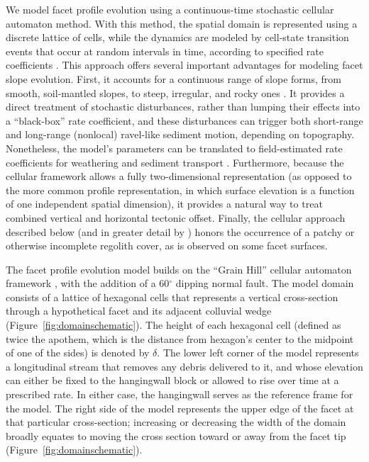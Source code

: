 We model facet profile evolution using a continuous-time stochastic cellular automaton method. With this method, the spatial domain is represented using a discrete lattice of cells, while the dynamics are modeled by cell-state transition events that occur at random intervals in time, according to specified rate coefficients \citep{narteau2001small,narteau2009setting}. This approach offers several important advantages for modeling facet slope evolution. First, it accounts for a continuous range of slope forms, from smooth, soil-mantled slopes, to steep, irregular, and rocky ones \citep{tucker2018lattice}. It provides a direct treatment of stochastic disturbances, rather than lumping their effects into a ``black-box'' rate coefficient, and these disturbances can trigger both short-range and long-range (nonlocal) ravel-like sediment motion, depending on topography. Nonetheless, the model's parameters can be translated to field-estimated rate coefficients for weathering and sediment transport \citep{tucker2018lattice}. Furthermore, because the cellular framework allows a fully two-dimensional representation (as opposed to the more common profile representation, in which surface elevation is a function of one independent spatial dimension), it provides a natural way to treat combined vertical and horizontal tectonic offset. Finally, the cellular approach described below (and in greater detail by \citet{tucker2016celllab,tucker2018lattice}) honors the occurrence of a patchy or otherwise incomplete regolith cover, as is observed on some facet surfaces.

The facet profile evolution model builds on the ``Grain Hill'' cellular automaton framework \citep{tucker2018lattice}, with the addition of a 60$^\circ$ dipping normal fault. The model domain consists of a lattice of hexagonal cells that represents a vertical cross-section through a hypothetical facet and its adjacent colluvial wedge (Figure~\ref{fig:domainschematic}). The height of each hexagonal cell (defined as twice the apothem, which is the distance from hexagon's center to the midpoint of one of the sides) is denoted by $\delta$. The lower left corner of the model represents a longitudinal stream that removes any debris delivered to it, and whose elevation can either be fixed to the hangingwall block or allowed to rise over time at a prescribed rate. In either case, the hangingwall serves as the reference frame for the model. The right side of the model represents the upper edge of the facet at that particular cross-section; increasing or decreasing the width of the domain broadly equates to moving the cross section toward or away from the facet tip (Figure~\ref{fig:domainschematic}).

